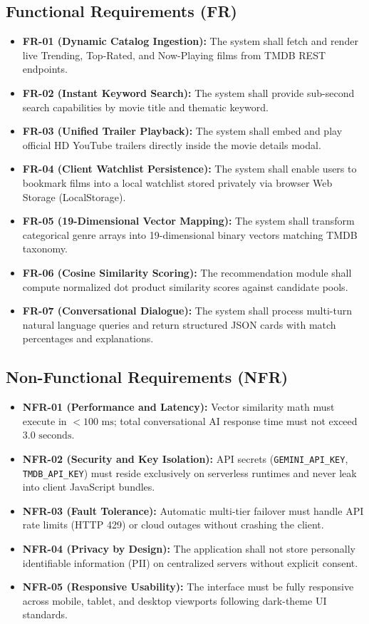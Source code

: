 \documentclass[11pt,a4paper]{article}
\begin{document}
\subsection{Functional Requirements (FR)}
\begin{itemize}[leftmargin=*]
    \item \textbf{FR-01 (Dynamic Catalog Ingestion):} The system shall fetch and render live Trending, Top-Rated, and Now-Playing films from TMDB REST endpoints.
    \item \textbf{FR-02 (Instant Keyword Search):} The system shall provide sub-second search capabilities by movie title and thematic keyword.
    \item \textbf{FR-03 (Unified Trailer Playback):} The system shall embed and play official HD YouTube trailers directly inside the movie details modal.
    \item \textbf{FR-04 (Client Watchlist Persistence):} The system shall enable users to bookmark films into a local watchlist stored privately via browser Web Storage (LocalStorage).
    \item \textbf{FR-05 (19-Dimensional Vector Mapping):} The system shall transform categorical genre arrays into 19-dimensional binary vectors matching TMDB taxonomy.
    \item \textbf{FR-06 (Cosine Similarity Scoring):} The recommendation module shall compute normalized dot product similarity scores against candidate pools.
    \item \textbf{FR-07 (Conversational Dialogue):} The system shall process multi-turn natural language queries and return structured JSON cards with match percentages and explanations.
\end{itemize}

\subsection{Non-Functional Requirements (NFR)}
\begin{itemize}[leftmargin=*]
    \item \textbf{NFR-01 (Performance and Latency):} Vector similarity math must execute in $< 100\text{ ms}$; total conversational AI response time must not exceed $3.0\text{ seconds}$.
    \item \textbf{NFR-02 (Security and Key Isolation):} API secrets (\texttt{GEMINI\_API\_KEY}, \texttt{TMDB\_API\_KEY}) must reside exclusively on serverless runtimes and never leak into client JavaScript bundles.
    \item \textbf{NFR-03 (Fault Tolerance):} Automatic multi-tier failover must handle API rate limits (HTTP 429) or cloud outages without crashing the client.
    \item \textbf{NFR-04 (Privacy by Design):} The application shall not store personally identifiable information (PII) on centralized servers without explicit consent.
    \item \textbf{NFR-05 (Responsive Usability):} The interface must be fully responsive across mobile, tablet, and desktop viewports following dark-theme UI standards.
\end{itemize}
\end{document}
